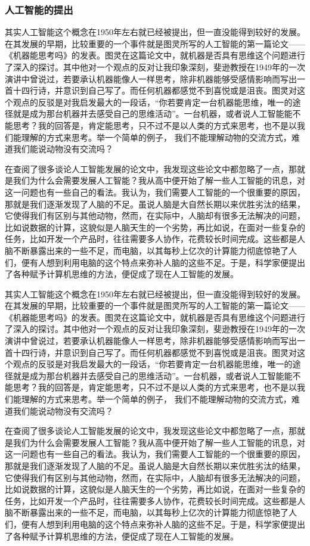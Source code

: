 \documentclass[UTF8]{XJTUthesis}
\begin{document}
\subsubsection{人工智能的提出}
其实人工智能这个概念在1950年左右就已经被提出，但一直没能得到较好的发展。在其发展的早期，比较重要的一个事件就是图灵所写的人工智能的第一篇论文——《机器能思考吗》的发表。图灵在这篇论文中，就机器是否具有思维这个问题进行了深入的探讨。其中他对一个观点的反对让我印象深刻，斐逊教授在1949年的一次演讲中曾说过，若要承认机器能像人一样思考，除非机器能够受感情影响而写出一首十四行诗，并意识到自己写了。而任何机器都感觉不到喜悦或是沮丧。图灵对这个观点的反驳是对我启发最大的一段话，“你若要肯定一台机器能思维，唯一的途径就是成为那台机器并去感受自己的思维活动”。一台机器，或者说人工智能能不能思考？我的回答是，肯定能思考，只不过不是以人类的方式来思考，也不是以我们能理解的方式来思考。举一个简单的例子， 我们不能理解动物的交流方式，难道我们能说动物没有交流吗？\par
在查阅了很多谈论人工智能发展的论文中，我发现这些论文中都忽略了一点，那就是我们为什么会需要发展人工智能？我从高中便开始了解一些人工智能的讯息，对这一问题也有一些自己的看法。我认为，我们需要人工智能的一个很重要的原因，那就是我们逐渐发现了人脑的不足。虽说人脑是大自然长期以来优胜劣汰的结果，它使得我们有区别与其他动物，然而，在实际中，人脑却有很多无法解决的问题，比如说数据的计算，这貌似是人脑天生的一个劣势，再比如说，在面对一些复杂的任务，比如开发一个产品时，往往需要多人协作，花费较长时间完成。这些都是人脑不断暴露出来的一些不足，而电脑，以其每秒上亿次的计算能力彻底惊艳了人们，便有人想到利用电脑的这个特点来弥补人脑的这些不足。于是，科学家便提出了各种赋予计算机思维的方法，便促成了现在人工智能的发展。\par
其实人工智能这个概念在1950年左右就已经被提出，但一直没能得到较好的发展。在其发展的早期，比较重要的一个事件就是图灵所写的人工智能的第一篇论文——《机器能思考吗》的发表。图灵在这篇论文中，就机器是否具有思维这个问题进行了深入的探讨。其中他对一个观点的反对让我印象深刻，斐逊教授在1949年的一次演讲中曾说过，若要承认机器能像人一样思考，除非机器能够受感情影响而写出一首十四行诗，并意识到自己写了。而任何机器都感觉不到喜悦或是沮丧。图灵对这个观点的反驳是对我启发最大的一段话，“你若要肯定一台机器能思维，唯一的途径就是成为那台机器并去感受自己的思维活动”。一台机器，或者说人工智能能不能思考？我的回答是，肯定能思考，只不过不是以人类的方式来思考，也不是以我们能理解的方式来思考。举一个简单的例子， 我们不能理解动物的交流方式，难道我们能说动物没有交流吗？\par
在查阅了很多谈论人工智能发展的论文中，我发现这些论文中都忽略了一点，那就是我们为什么会需要发展人工智能？我从高中便开始了解一些人工智能的讯息，对这一问题也有一些自己的看法。我认为，我们需要人工智能的一个很重要的原因，那就是我们逐渐发现了人脑的不足。虽说人脑是大自然长期以来优胜劣汰的结果，它使得我们有区别与其他动物，然而，在实际中，人脑却有很多无法解决的问题，比如说数据的计算，这貌似是人脑天生的一个劣势，再比如说，在面对一些复杂的任务，比如开发一个产品时，往往需要多人协作，花费较长时间完成。这些都是人脑不断暴露出来的一些不足，而电脑，以其每秒上亿次的计算能力彻底惊艳了人们，便有人想到利用电脑的这个特点来弥补人脑的这些不足。于是，科学家便提出了各种赋予计算机思维的方法，便促成了现在人工智能的发展。\par
\end{document}
